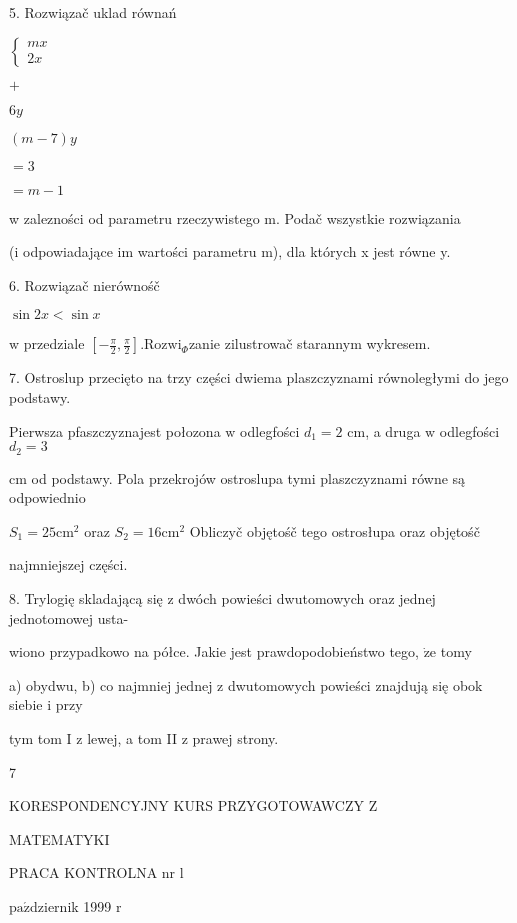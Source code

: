\documentclass[a4paper,12pt]{article}
\begin{document}
5. Rozwiązač uklad równań

$\left\{\begin{array}{l}
mx\\
2x
\end{array}\right.$

$+$

$6y$

$(m-7)y$

$=3$

$=m-1$

w zalezności od parametru rzeczywistego m. Podač wszystkie rozwiązania

(i odpowiadające im wartości parametru m), dla których x jest równe y.

6. Rozwiązač nierównośč

$\sin 2x<\sin x$

$\mathrm{w}$ przedziale $[-\displaystyle \frac{\pi}{2},\frac{\pi}{2}]. \mathrm{R}\mathrm{o}\mathrm{z}\mathrm{w}\mathrm{i}_{\Phi}$zanie zilustrowač starannym wykresem.

7. Ostroslup przecięto na trzy części dwiema plaszczyznami równoległymi do jego podstawy.

Pierwsza pfaszczyznajest połozona $\mathrm{w}$ odlegfości $d_{1} =2$ cm, a druga $\mathrm{w}$ odlegfości $d_{2}=3$

cm od podstawy. Pola przekrojów ostroslupa tymi plaszczyznami równe są odpowiednio

$S_{1} = 25 \mathrm{c}\mathrm{m}^{2}$ oraz $S_{2} = 16 \mathrm{c}\mathrm{m}^{2}$ Obliczyč objętośč tego ostrosłupa oraz objętośč

najmniejszej części.

8. Trylogię skladającą się $\mathrm{z}$ dwóch powieści dwutomowych oraz jednej jednotomowej usta-

wiono przypadkowo na półce. Jakie jest prawdopodobieństwo tego, $\dot{\mathrm{z}}\mathrm{e}$ tomy

a) obydwu, b) co najmniej jednej $\mathrm{z}$ dwutomowych powieści znajdują się obok siebie $\mathrm{i}$ przy

tym tom I $\mathrm{z}$ lewej, a tom II $\mathrm{z}$ prawej strony.

7






KORESPONDENCYJNY KURS PRZYGOTOWAWCZY Z

MATEMATYKI

PRACA KONTROLNA nr l

$\mathrm{p}\mathrm{a}\acute{\mathrm{z}}$dziernik 1999 $\mathrm{r}$
\end{document}
